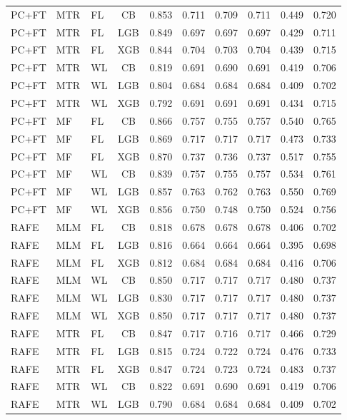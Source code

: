 \documentclass[9pt,a4paper]{article}
\begin{document}
\begin{scriptsize}
\begin{longtable}{lllcrrrrrr}
PC+FT & MTR & FL & CB  & 0.853 & 0.711 & 0.709 & 0.711 & 0.449 & 0.720 \\
PC+FT & MTR & FL & LGB & 0.849 & 0.697 & 0.697 & 0.697 & 0.429 & 0.711 \\
PC+FT & MTR & FL & XGB & 0.844 & 0.704 & 0.703 & 0.704 & 0.439 & 0.715 \\
PC+FT & MTR & WL & CB  & 0.819 & 0.691 & 0.690 & 0.691 & 0.419 & 0.706 \\
PC+FT & MTR & WL & LGB & 0.804 & 0.684 & 0.684 & 0.684 & 0.409 & 0.702 \\
PC+FT & MTR & WL & XGB & 0.792 & 0.691 & 0.691 & 0.691 & 0.434 & 0.715 \\
PC+FT & MF  & FL & CB  & 0.866 & 0.757 & 0.755 & 0.757 & 0.540 & 0.765 \\
PC+FT & MF  & FL & LGB & 0.869 & 0.717 & 0.717 & 0.717 & 0.473 & 0.733 \\
PC+FT & MF  & FL & XGB & 0.870 & 0.737 & 0.736 & 0.737 & 0.517 & 0.755 \\
PC+FT & MF  & WL & CB  & 0.839 & 0.757 & 0.755 & 0.757 & 0.534 & 0.761 \\
PC+FT & MF  & WL & LGB & 0.857 & 0.763 & 0.762 & 0.763 & 0.550 & 0.769 \\
PC+FT & MF  & WL & XGB & 0.856 & 0.750 & 0.748 & 0.750 & 0.524 & 0.756 \\
\midrule
RAFE & MLM & FL & CB  & 0.818 & 0.678 & 0.678 & 0.678 & 0.406 & 0.702 \\
RAFE & MLM & FL & LGB & 0.816 & 0.664 & 0.664 & 0.664 & 0.395 & 0.698 \\
RAFE & MLM & FL & XGB & 0.812 & 0.684 & 0.684 & 0.684 & 0.416 & 0.706 \\
RAFE & MLM & WL & CB  & 0.850 & 0.717 & 0.717 & 0.717 & 0.480 & 0.737 \\
RAFE & MLM & WL & LGB & 0.830 & 0.717 & 0.717 & 0.717 & 0.480 & 0.737 \\
RAFE & MLM & WL & XGB & 0.850 & 0.717 & 0.717 & 0.717 & 0.480 & 0.737 \\
RAFE & MTR & FL & CB  & 0.847 & 0.717 & 0.716 & 0.717 & 0.466 & 0.729 \\
RAFE & MTR & FL & LGB & 0.815 & 0.724 & 0.722 & 0.724 & 0.476 & 0.733 \\
RAFE & MTR & FL & XGB & 0.847 & 0.724 & 0.723 & 0.724 & 0.483 & 0.737 \\
RAFE & MTR & WL & CB  & 0.822 & 0.691 & 0.690 & 0.691 & 0.419 & 0.706 \\
RAFE & MTR & WL & LGB & 0.790 & 0.684 & 0.684 & 0.684 & 0.409 & 0.702 \\

\end{longtable}
\end{scriptsize}
\end{document}
